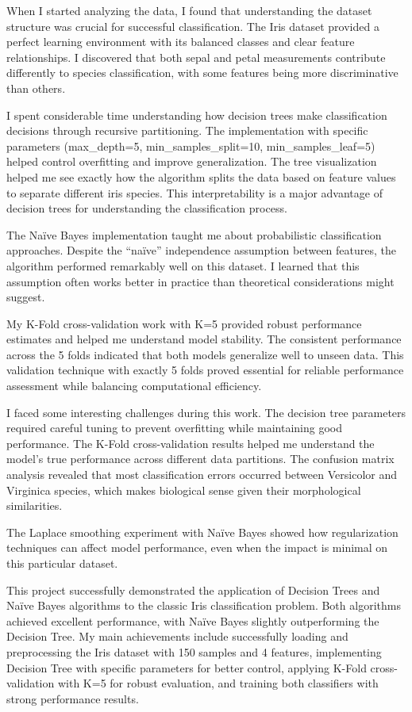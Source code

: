 \documentclass[12pt,a4paper]{article}
\begin{document}
When I started analyzing the data, I found that understanding the dataset structure was crucial for successful classification. The Iris dataset provided a perfect learning environment with its balanced classes and clear feature relationships. I discovered that both sepal and petal measurements contribute differently to species classification, with some features being more discriminative than others.

I spent considerable time understanding how decision trees make classification decisions through recursive partitioning. The implementation with specific parameters (max\_depth=5, min\_samples\_split=10, min\_samples\_leaf=5) helped control overfitting and improve generalization. The tree visualization helped me see exactly how the algorithm splits the data based on feature values to separate different iris species. This interpretability is a major advantage of decision trees for understanding the classification process.

The Na\"{i}ve Bayes implementation taught me about probabilistic classification approaches. Despite the ``na\"{i}ve'' independence assumption between features, the algorithm performed remarkably well on this dataset. I learned that this assumption often works better in practice than theoretical considerations might suggest.

My K-Fold cross-validation work with K=5 provided robust performance estimates and helped me understand model stability. The consistent performance across the 5 folds indicated that both models generalize well to unseen data. This validation technique with exactly 5 folds proved essential for reliable performance assessment while balancing computational efficiency.

I faced some interesting challenges during this work. The decision tree parameters required careful tuning to prevent overfitting while maintaining good performance. The K-Fold cross-validation results helped me understand the model's true performance across different data partitions. The confusion matrix analysis revealed that most classification errors occurred between Versicolor and Virginica species, which makes biological sense given their morphological similarities.

The Laplace smoothing experiment with Na\"{i}ve Bayes showed how regularization techniques can affect model performance, even when the impact is minimal on this particular dataset.

This project successfully demonstrated the application of Decision Trees and Na\"{i}ve Bayes algorithms to the classic Iris classification problem. Both algorithms achieved excellent performance, with Na\"{i}ve Bayes slightly outperforming the Decision Tree. My main achievements include successfully loading and preprocessing the Iris dataset with 150 samples and 4 features, implementing Decision Tree with specific parameters for better control, applying K-Fold cross-validation with K=5 for robust evaluation, and training both classifiers with strong performance results.
\end{document}
